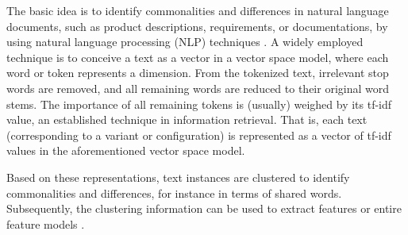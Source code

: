 The basic idea is to identify commonalities and differences in natural language
documents, such as product descriptions, requirements, or documentations, by
using natural language processing (NLP) techniques \citep{bakar_feature_2015}. A
widely employed technique is to conceive a text as a vector in a vector space model, where each word or
token represents a dimension. From the tokenized text, irrelevant stop words
are removed, and all remaining words are reduced to their original word stems.
The importance of all remaining tokens is (usually) weighed by its tf-idf
value, an established technique in information retrieval. That is, each text
(corresponding to a variant or configuration) is represented as a vector of
tf-idf values in the aforementioned vector space model. 

Based on these representations, text instances are clustered to identify
commonalities and differences, for instance in terms of shared words.
Subsequently, the clustering information can be used to extract features or entire feature
models \citep{alves_exploratory_2008,bakar_feature_2015}.


